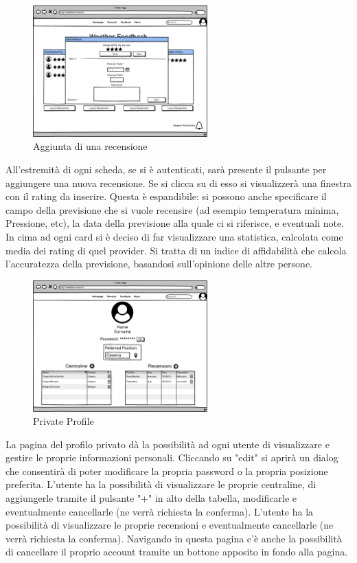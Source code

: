 \begin{figure}[H]
    \caption{Aggiunta di una recensione}
    \label{fig:FeedbacksDialog}
    \centering
    \includegraphics[width=0.6\textwidth]{MockUps/sendFeedback.png}
\end{figure}

All'estremità di ogni scheda, se si è autenticati, sarà presente il pulsante per aggiungere una nuova recensione. Se si clicca su di esso si visualizzerà una finestra con il rating da inserire. Questa è espandibile: si possono anche specificare il campo della previsione che si vuole recensire (ad esempio temperatura minima, Pressione, etc), la data della previsione alla quale ci si riferisce, e eventuali note.
In cima ad ogni card si è deciso di far visualizzare una statistica, calcolata come media dei rating di quel provider. Si tratta di un indice di affidabilità che calcola l'accuratezza della previsione, basandosi sull'opinione delle altre persone.

\begin{figure}[H]
    \caption{Private Profile}
    \label{fig:PrivateProfile}
    \centering
    \includegraphics[width=0.6\textwidth]{MockUps/Private Profile.png}
\end{figure}
La pagina del profilo privato dà la possibilità ad ogni utente di visualizzare e gestire le proprie informazioni personali. Cliccando su "edit" si aprirà un dialog che consentirà di poter modificare la propria password o la propria posizione preferita.
L'utente ha la possibilità di visualizzare le proprie centraline, di aggiungerle tramite il pulsante "+" in alto della tabella, modificarle e eventualmente cancellarle (ne verrà richiesta la conferma).
L'utente ha la possibilità di visualizzare le proprie recensioni e eventualmente cancellarle (ne verrà richiesta la conferma).
Navigando in questa pagina c'è anche la possibilità di cancellare il proprio account tramite un bottone apposito in fondo alla pagina.

